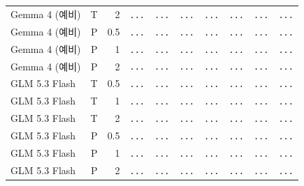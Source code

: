 \begin{table}[H]
\begin{tabular}{@{}lrrrrrrrrr@{}}
Gemma 4 (예비) & T & 2 & {\color{gray}\texttt{...}} & {\color{gray}\texttt{...}} & {\color{gray}\texttt{...}} & {\color{gray}\texttt{...}} & {\color{gray}\texttt{...}} & {\color{gray}\texttt{...}} & {\color{gray}\texttt{...}} \\
Gemma 4 (예비) & P & 0.5 & {\color{gray}\texttt{...}} & {\color{gray}\texttt{...}} & {\color{gray}\texttt{...}} & {\color{gray}\texttt{...}} & {\color{gray}\texttt{...}} & {\color{gray}\texttt{...}} & {\color{gray}\texttt{...}} \\
Gemma 4 (예비) & P & 1 & {\color{gray}\texttt{...}} & {\color{gray}\texttt{...}} & {\color{gray}\texttt{...}} & {\color{gray}\texttt{...}} & {\color{gray}\texttt{...}} & {\color{gray}\texttt{...}} & {\color{gray}\texttt{...}} \\
Gemma 4 (예비) & P & 2 & {\color{gray}\texttt{...}} & {\color{gray}\texttt{...}} & {\color{gray}\texttt{...}} & {\color{gray}\texttt{...}} & {\color{gray}\texttt{...}} & {\color{gray}\texttt{...}} & {\color{gray}\texttt{...}} \\
GLM 5.3 Flash & T & 0.5 & {\color{gray}\texttt{...}} & {\color{gray}\texttt{...}} & {\color{gray}\texttt{...}} & {\color{gray}\texttt{...}} & {\color{gray}\texttt{...}} & {\color{gray}\texttt{...}} & {\color{gray}\texttt{...}} \\
GLM 5.3 Flash & T & 1 & {\color{gray}\texttt{...}} & {\color{gray}\texttt{...}} & {\color{gray}\texttt{...}} & {\color{gray}\texttt{...}} & {\color{gray}\texttt{...}} & {\color{gray}\texttt{...}} & {\color{gray}\texttt{...}} \\
GLM 5.3 Flash & T & 2 & {\color{gray}\texttt{...}} & {\color{gray}\texttt{...}} & {\color{gray}\texttt{...}} & {\color{gray}\texttt{...}} & {\color{gray}\texttt{...}} & {\color{gray}\texttt{...}} & {\color{gray}\texttt{...}} \\
GLM 5.3 Flash & P & 0.5 & {\color{gray}\texttt{...}} & {\color{gray}\texttt{...}} & {\color{gray}\texttt{...}} & {\color{gray}\texttt{...}} & {\color{gray}\texttt{...}} & {\color{gray}\texttt{...}} & {\color{gray}\texttt{...}} \\
GLM 5.3 Flash & P & 1 & {\color{gray}\texttt{...}} & {\color{gray}\texttt{...}} & {\color{gray}\texttt{...}} & {\color{gray}\texttt{...}} & {\color{gray}\texttt{...}} & {\color{gray}\texttt{...}} & {\color{gray}\texttt{...}} \\
GLM 5.3 Flash & P & 2 & {\color{gray}\texttt{...}} & {\color{gray}\texttt{...}} & {\color{gray}\texttt{...}} & {\color{gray}\texttt{...}} & {\color{gray}\texttt{...}} & {\color{gray}\texttt{...}} & {\color{gray}\texttt{...}} \\
\bottomrule
\end{tabular}
\end{table}
